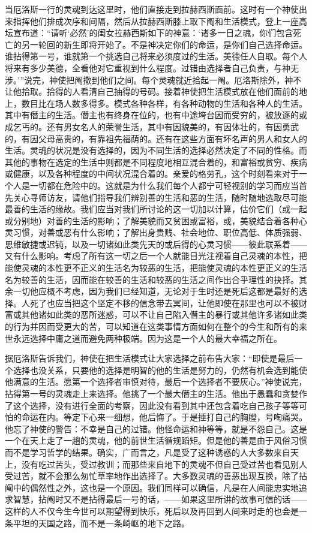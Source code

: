 \documentclass[12pt,oneside]{book}
\begin{document}
当厄洛斯一行的灵魂到达这里时，他们直接走到拉赫西斯面前。这时有一个神使出来指挥他们排成次序和间隔，然后从拉赫西斯膝上取下阄和生活模式，登上一座高坛宣布道：“请听‘必然’的闺女拉赫西斯如下的神意：‘诸多一日之魂，你们包含死亡的另一轮回的新生即将开始了。不是神决定你们的命运，是你们自己选择命运。谁拈得第一号，谁就第一个挑选自己将来必须度过的生活。美德任人自取。每个人将来有多少美德，全看他对它重视到什么程度。过错由选择者自己负责，与神无涉。’”说完，神使把阄撒到他们之间。每个灵魂就近拾起一阄。厄洛斯除外，神不让他拾取。拾得的人看清自己抽得的号码。接着神使把生活模式放在他们面前的地上，数目比在场人数多得多。模式各种各样，有各种动物的生活和各种人的生活。其中有僭主的生活。僭主也有终身在位的，也有中途垮台因而受穷的，被放逐的或成乞丐的。还有男女名人的荣誉生活，其中有因貌美的，有因体壮的，有因勇武的，有因父母高贵的，有靠祖先福荫的。还有在这些方面有坏名声的男人和女人的生活。灵魂的状况是没有选择的，因为不同生活的选择必然决定了不同的性格。而其他的事物在选定的生活中则都是不同程度地相互混合着的，和富裕或贫穷、疾病或健康，以及各种程度的中间状况混合着的。亲爱的格劳孔，这个时刻看来对于一个人是一切都在危险中的。这就是为什么我们每个人都宁可轻视别的学习而应当首先关心寻师访友，请他们指导我们辨别善的生活和恶的生活，随时随地选取尽可能最善的生活的缘故。我们应当对我们所讨论的这一切加以计算，估价它们（或一起或分别地）对善的生活的影响；了解美貌而又贫困或富裕，或，美貌结合着各种心灵习惯，对善或恶有什么影响；了解出身贵贱、社会地位、职位高低、体质强弱、思维敏捷或迟钝，以及一切诸如此类先天的或后得的心灵习惯——彼此联系着——又有什么影响。考虑了所有这一切之后一个人就能目光注视着自己灵魂的本性，把能使灵魂的本性更不正义的生活名为较恶的生活，把能使灵魂的本性更正义的生活名为较善的生活，因而能在较善的生活和较恶的生活之间作出合乎理性的抉择。其余一切他应概不考虑，因为我们已经知道，无论对于生时还是死后这都是最好的选择。人死了也应当把这个坚定不移的信念带去冥间，让他即使在那里也可以不被财富或其他诸如此类的恶所迷惑，可以不让自己陷入僭主的暴行或其他许多诸如此类的行为并因而受更大的苦，可以知道在这类事情方面如何在整个的今生和所有的来世永远选择中庸之道而避免两种极端。因为这是一个人的最大幸福之所在。

据厄洛斯告诉我们，神使在把生活模式让大家选择之前布告大家：“即使是最后一个选择也没关系，只要他的选择是明智的他的生活是努力的，仍然有机会选到能使他满意的生活。愿第一个选择者审慎对待，最后一个选择者不要灰心。”神使说完，拈得第一号的灵魂走上来选择。他挑了一个最大僭主的生活。他出于愚蠢和贪婪作了这个选择，没有进行全面的考察，因此没有看到其中还包含着吃自己孩子等等可怕的命运在内。等定下心来一细想，他后悔了。于是捶打自己的胸膛，号啕痛哭。他忘了神使的警告：不幸是自己的过错。他怪命运和神等等，就是不怨自己。这是一个在天上走了一趟的灵魂，他的前世生活循规蹈矩。但是他的善是由于风俗习惯而不是学习哲学的结果。确实，广而言之，凡是受了这种诱惑的人大多数来自天上，没有吃过苦头，受过教训；而那些来自地下的灵魂不但自己受过苦也看见别人受过苦，就不会那么匆忙草率地作出选择了。大多数灵魂的善恶出现互换，除了拈阄中的偶然性之外，这也是一个原因。我们同样可以确信，凡是在人间能忠实地追求智慧，拈阄时又不是拈得最后一号的话，——如果这里所讲的故事可信的话——这样的人不仅今生今世可以期望得到快乐，死后以及再回到人间来时走的也会是一条平坦的天国之路，而不是一条崎岖的地下之路。
\end{document}
